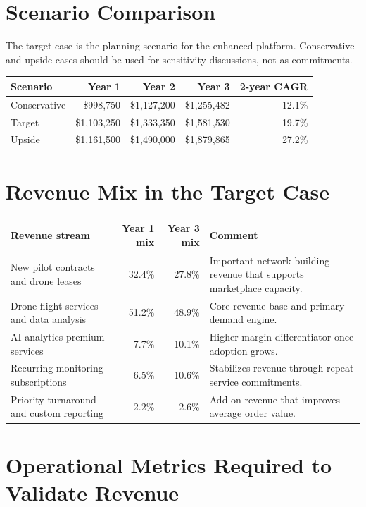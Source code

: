\documentclass[11pt,a4paper]{article}
\begin{document}
\section{Scenario Comparison}

The target case is the planning scenario for the enhanced platform. Conservative and upside cases should be used for sensitivity discussions, not as commitments.

\begin{longtable}{p{}r r r r}
\toprule
\textbf{Scenario} & \textbf{Year 1} & \textbf{Year 2} & \textbf{Year 3} & \textbf{2-year CAGR} \\
\midrule
Conservative & \$998,750 & \$1,127,200 & \$1,255,482 & 12.1\% \\
Target & \$1,103,250 & \$1,333,350 & \$1,581,530 & 19.7\% \\
Upside & \$1,161,500 & \$1,490,000 & \$1,879,865 & 27.2\% \\
\bottomrule
\end{longtable}

\section{Revenue Mix in the Target Case}

\begin{longtable}{p{}r r p{}}
\toprule
\textbf{Revenue stream} & \textbf{Year 1 mix} & \textbf{Year 3 mix} & \textbf{Comment} \\
\midrule
New pilot contracts and drone leases & 32.4\% & 27.8\% & Important network-building revenue that supports marketplace capacity. \\
Drone flight services and data analysis & 51.2\% & 48.9\% & Core revenue base and primary demand engine. \\
AI analytics premium services & 7.7\% & 10.1\% & Higher-margin differentiator once adoption grows. \\
Recurring monitoring subscriptions & 6.5\% & 10.6\% & Stabilizes revenue through repeat service commitments. \\
Priority turnaround and custom reporting & 2.2\% & 2.6\% & Add-on revenue that improves average order value. \\
\bottomrule
\end{longtable}

\section{Operational Metrics Required to Validate Revenue}
\end{document}
